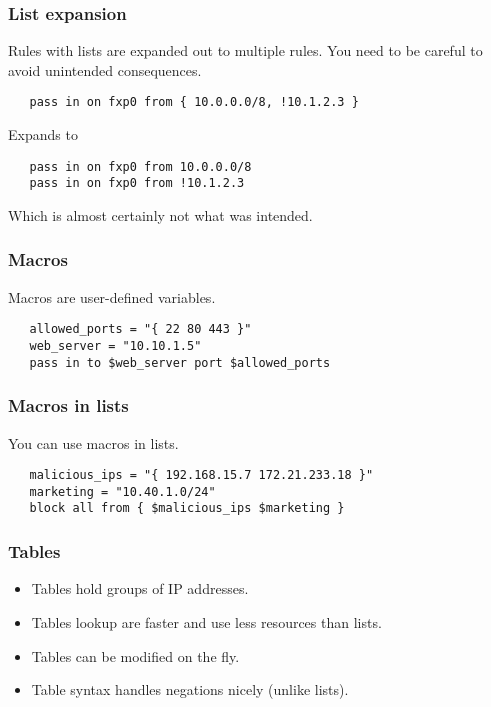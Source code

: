 \documentclass[10pt]{beamer}
\begin{document}
\begin{frame}[fragile]
  \frametitle{List expansion}
 Rules with lists are expanded out to multiple rules.  You need
 to be careful to avoid unintended consequences.
 \begin{verbatim}
   pass in on fxp0 from { 10.0.0.0/8, !10.1.2.3 }
 \end{verbatim}
 Expands to 
 \begin{verbatim}
   pass in on fxp0 from 10.0.0.0/8
   pass in on fxp0 from !10.1.2.3
 \end{verbatim}
 Which is almost certainly not what was intended.
\end{frame}


\begin{frame}[fragile]
  \frametitle{Macros}

 Macros are user-defined variables.
 \begin{verbatim}
   allowed_ports = "{ 22 80 443 }"
   web_server = "10.10.1.5"
   pass in to $web_server port $allowed_ports
 \end{verbatim}

\end{frame}


\begin{frame}[fragile]
  \frametitle{Macros in lists}

 You can use macros in lists.
 \begin{verbatim}
   malicious_ips = "{ 192.168.15.7 172.21.233.18 }"
   marketing = "10.40.1.0/24"
   block all from { $malicious_ips $marketing }
 \end{verbatim}

\end{frame}


\begin{frame}
  \frametitle{Tables}

 \begin{itemize}
   \item Tables hold groups of IP addresses.
   \item Tables lookup are faster and use less resources than lists.
   \item Tables can be modified on the fly.
   \item Table syntax handles negations nicely (unlike lists).
 \end{itemize}

\end{frame}
\end{document}
